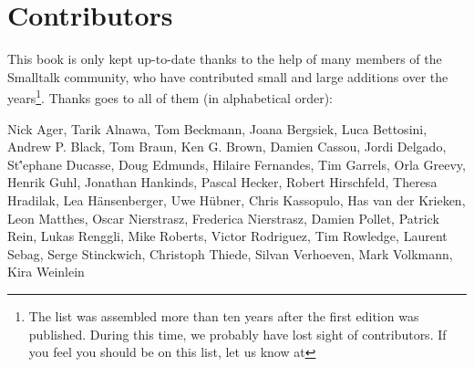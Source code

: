 \chapter*{Contributors}
This book is only kept up-to-date thanks to the help of many members of the Smalltalk community, who have contributed small and large additions over the years\footnote{The list was assembled more than ten years after the first edition was published. During this time, we probably have lost sight of contributors. If you feel you should be on this list, let us know at \sbeRepoUrl}. Thanks goes to all of them (in alphabetical order):

\begin{flushleft}
Nick Ager, Tarik Alnawa, Tom Beckmann, Joana Bergsiek, Luca Bettosini, Andrew P. Black, Tom Braun, Ken G. Brown, Damien Cassou, Jordi Delgado, St\''ephane Ducasse, Doug Edmunds, Hilaire Fernandes, Tim Garrels, Orla Greevy, Henrik Guhl, Jonathan Hankinds, Pascal Hecker, Robert Hirschfeld, Theresa Hradilak, Lea H\"ansenberger, Uwe H\"ubner, Chris Kassopulo, Has van der Krieken, Leon Matthes, Oscar Nierstrasz, Frederica Nierstrasz, Damien Pollet, Patrick Rein, Lukas Renggli, Mike Roberts, Victor Rodriguez, Tim Rowledge, Laurent Sebag, Serge Stinckwich, Christoph Thiede, Silvan Verhoeven, Mark Volkmann, Kira Weinlein
\end{flushleft}


%
%
